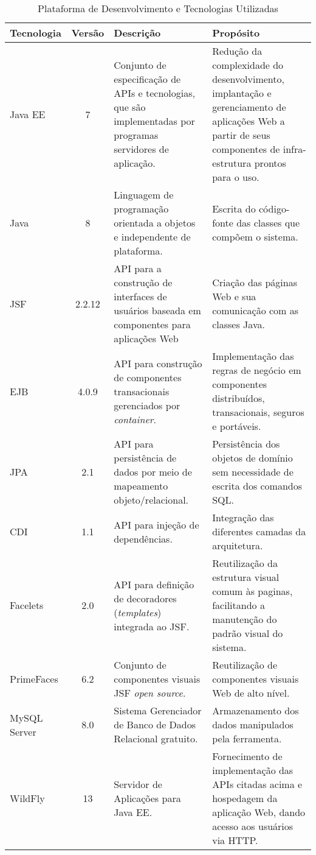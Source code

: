 \begin{table}[h]
	\centering	
	\vspace{0.5cm}
	\footnotesize
	\caption{Plataforma de Desenvolvimento e Tecnologias Utilizadas}	
	\label{tabela-plataforma}
	\begin{tabular}{|p{1.6cm}|c|p{5cm}|p{6.5cm}|}  \hline 
 		Tecnologia & Versão & Descrição & Propósito \\\hline 
 		
		Java EE & 7 & Conjunto de especificação de APIs e tecnologias, que são implementadas por programas servidores de aplicação. & Redução da complexidade do desenvolvimento, implantação e gerenciamento de aplicações Web a partir de seus componentes de infra-estrutura prontos para o uso. \\ \hline

		Java & 8 & Linguagem de programação orientada a objetos e independente de plataforma. & Escrita do código-fonte das classes que compõem o sistema. \\\hline
		
		JSF & 2.2.12 & API para a construção de interfaces de usuários baseada em componentes para aplicações Web & Criação das páginas Web e sua comunicação com as classes Java.  \\\hline  
		
		EJB & 4.0.9 & API para construção de componentes transacionais gerenciados por \textit{container}. & Implementação das regras de negócio em componentes distribuídos, transacionais, seguros e portáveis. \\\hline
		
		JPA & 2.1 & API para persistência de dados por meio de mapeamento objeto/relacional. & Persistência dos objetos de domínio sem necessidade de escrita dos comandos SQL. \\\hline
		
		CDI & 1.1 & API para injeção de dependências. & Integração das diferentes camadas da arquitetura. \\\hline
		
		Facelets & 2.0 &  API para definição de decoradores (\textit{templates}) integrada ao JSF. & Reutilização da estrutura visual comum às paginas, facilitando a manutenção do padrão visual do sistema. \\\hline
		
		PrimeFaces & 6.2 &  Conjunto de componentes visuais JSF \textit{open source}. & Reutilização de componentes visuais Web de alto nível. \\\hline
		
		MySQL Server & 8.0 & Sistema Gerenciador de Banco de Dados Relacional gratuito. & Armazenamento dos dados manipulados pela ferramenta. \\\hline
		
		WildFly & 13 & Servidor de Aplicações para Java EE. & Fornecimento de implementação das APIs citadas acima e hospedagem da aplicação Web, dando acesso aos usuários via HTTP. \\\hline
	\end{tabular}
\end{table}







